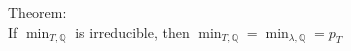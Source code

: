 \documentclass[preview]{standalone}
\begin{document}
\begin{center}
Theorem: \\ If $\min_{T, \mathbb{Q}}$ is irreducible, then $\min_{T, \mathbb{Q}} = \min_{\lambda, \mathbb{Q}} = p_T$
\end{center}
\end{document}
